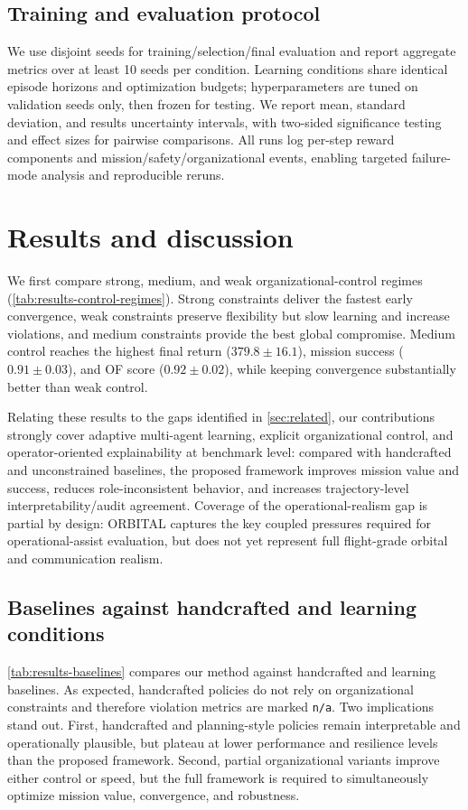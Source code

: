 \documentclass[sigconf]{aamas}
\begin{document}
\subsection{Training and evaluation protocol}
We use disjoint seeds for training/selection/final evaluation and report aggregate metrics over at least 10 seeds per condition. Learning conditions share identical episode horizons and optimization budgets; hyperparameters are tuned on validation seeds only, then frozen for testing. We report mean, standard deviation, and results uncertainty intervals, with two-sided significance testing and effect sizes for pairwise comparisons. All runs log per-step reward components and mission/safety/organizational events, enabling targeted failure-mode analysis and reproducible reruns.

\section{Results and discussion}
\label{sec:results}

We first compare strong, medium, and weak organizational-control regimes (\autoref{tab:results-control-regimes}). Strong constraints deliver the fastest early convergence, weak constraints preserve flexibility but slow learning and increase violations, and medium constraints provide the best global compromise. Medium control reaches the highest final return ($379.8 \pm 16.1$), mission success ($0.91 \pm 0.03$), and OF score ($0.92 \pm 0.02$), while keeping convergence substantially better than weak control.

Relating these results to the gaps identified in \autoref{sec:related}, our contributions strongly cover adaptive multi-agent learning, explicit organizational control, and operator-oriented explainability at benchmark level: compared with handcrafted and unconstrained baselines, the proposed framework improves mission value and success, reduces role-inconsistent behavior, and increases trajectory-level interpretability/audit agreement. Coverage of the operational-realism gap is partial by design: ORBITAL captures the key coupled pressures required for operational-assist evaluation, but does not yet represent full flight-grade orbital and communication realism.

\subsection{Baselines against handcrafted and learning conditions}
\autoref{tab:results-baselines} compares our method against handcrafted and learning baselines. As expected, handcrafted policies do not rely on organizational constraints and therefore violation metrics are marked \texttt{n/a}.
%
Two implications stand out. First, handcrafted and planning-style policies remain interpretable and operationally plausible, but plateau at lower performance and resilience levels than the proposed framework. Second, partial organizational variants improve either control or speed, but the full framework is required to simultaneously optimize mission value, convergence, and robustness.
\end{document}
